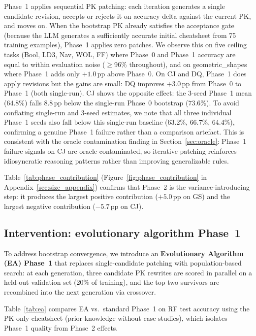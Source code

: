 \documentclass{article}
\begin{document}
Phase~1 applies sequential PK patching: each iteration generates a single candidate revision,
accepts or rejects it on accuracy delta against the current PK, and moves on.
When the bootstrap PK already satisfies the acceptance gate (because the LLM generates a
sufficiently accurate initial cheatsheet from 75 training examples), Phase~1 applies zero
patches.
We observe this on five ceiling tasks (Bool, LD3, Nav, WOL, FF) where Phase~0 and Phase~1
accuracy are equal to within evaluation noise ($\geq$96\% throughout), and on geometric\_shapes
where Phase~1 adds only $+1.0$\,pp above Phase~0.
On CJ and DQ, Phase~1 does apply revisions but the gains are small: DQ improves
$+3.0$\,pp from Phase~0 to Phase~1 (both single-run).
CJ shows the opposite effect: the 3-seed Phase~1 mean ($64.8\%$) falls $8.8$\,pp below
the single-run Phase~0 bootstrap ($73.6\%$).
To avoid conflating single-run and 3-seed estimates, we note that all three individual
Phase~1 seeds also fall below this single-run baseline ($63.2\%$, $66.7\%$, $64.4\%$),
confirming a genuine Phase~1 failure rather than a comparison artefact.
This is consistent with the oracle contamination finding in Section~\ref{sec:oracle}:
Phase~1 failure signals on CJ are oracle-contaminated, so iterative patching reinforces
idiosyncratic reasoning patterns rather than improving generalizable rules.

Table~\ref{tab:phase_contribution} (Figure~\ref{fig:phase_contribution} in
Appendix~\ref{sec:size_appendix}) confirms that Phase~2 is the variance-introducing step:
it produces the largest positive contribution ($+5.0$\,pp on GS) and the largest negative
contribution ($-5.7$\,pp on CJ).

\subsection{Intervention: evolutionary algorithm Phase~1}
\label{sec:ea}

To address bootstrap convergence, we introduce an \textbf{Evolutionary Algorithm (EA) Phase~1}
that replaces single-candidate patching with population-based search: at each generation,
three candidate PK rewrites are scored in parallel on a held-out validation set (20\% of
training), and the top two survivors are recombined into the next generation via crossover.

Table~\ref{tab:ea} compares EA vs.\ standard Phase~1 on RF test accuracy using the PK-only
cheatsheet (prior knowledge without case studies), which isolates Phase~1 quality from
Phase~2 effects.
\end{document}

